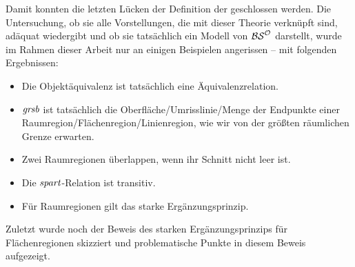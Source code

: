     Damit
    konnten die letzten Lücken der Definition der \strukt geschlossen werden. 
    Die Untersuchung, ob sie alle Vorstellungen, die mit dieser Theorie verknüpft sind, adäquat wiedergibt und ob sie tatsächlich ein Modell von $\mathcal{BS}^{\mathcal{O}}$ darstellt, wurde im Rahmen dieser Arbeit nur an einigen Beispielen angerissen -- mit folgenden Ergebnissen:
    \begin{itemize}
        \item Die Objektäquivalenz ist tatsächlich eine Äquivalenzrelation.
        \item $\mathit{gr\hspace*{-0.25ex}sb}$ ist tatsächlich die Oberfläche/Umrisslinie/Menge der Endpunkte einer Raumregion/Flächenregion/Linienregion, wie wir von der größten räumlichen Grenze erwarten.
        \item Zwei Raumregionen überlappen, wenn ihr Schnitt nicht leer ist.
        \item Die $\mathit{spart}$-Relation ist transitiv.
        \item Für Raumregionen gilt das starke Ergänzungsprinzip.
    \end{itemize}
    Zuletzt wurde noch der Beweis des starken Ergänzungsprinzips für Flächenregionen skizziert und problematische Punkte in diesem Beweis aufgezeigt.


